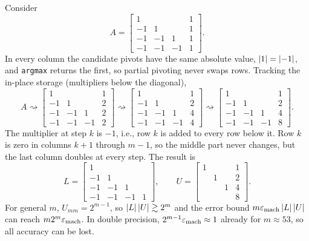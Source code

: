 \begin{example}
  \label{ex:growth}
  Consider
  \begin{equation}
    A = \begin{bmatrix} 1 & & & 1 \\ -1 & 1 & & 1 \\ -1 & -1 & 1 & 1 \\ -1 & -1 & -1 & 1 \end{bmatrix}.
  \end{equation}
  In every column the candidate pivots have the same absolute value, $\left\lvert 1 \right\rvert = \left\lvert -1 \right\rvert$, and \texttt{argmax} returns the first, so partial pivoting never swaps rows. Tracking the in-place storage (multipliers below the diagonal),
  \begin{equation}
    A \rightsquigarrow
    \begin{bmatrix} 1 & & & 1 \\ -1 & 1 & & 2 \\ -1 & -1 & 1 & 2 \\ -1 & -1 & -1 & 2 \end{bmatrix} \rightsquigarrow
    \begin{bmatrix} 1 & & & 1 \\ -1 & 1 & & 2 \\ -1 & -1 & 1 & 4 \\ -1 & -1 & -1 & 4 \end{bmatrix} \rightsquigarrow
    \begin{bmatrix} 1 & & & 1 \\ -1 & 1 & & 2 \\ -1 & -1 & 1 & 4 \\ -1 & -1 & -1 & 8 \end{bmatrix}.
  \end{equation}
  The multiplier at step $k$ is $-1$, i.e., row $k$ is added to every row below it. Row $k$ is zero in columns $k + 1$ through $m - 1$, so the middle part never changes, but the last column doubles at every step. The result is
  \begin{equation}
    L = \begin{bmatrix} 1 & & & \\ -1 & 1 & & \\ -1 & -1 & 1 & \\ -1 & -1 & -1 & 1 \end{bmatrix}, \qquad
    U = \begin{bmatrix} 1 & & & 1 \\ & 1 & & 2 \\ & & 1 & 4 \\ & & & 8 \end{bmatrix}.
  \end{equation}
  For general $m$, $U_{mm} = 2^{m-1}$, so $\left\lvert L \right\rvert\left\lvert U \right\rvert \gtrsim 2^m$ and the error bound $m\varepsilon_{\mathrm{mach}}\left\lvert L \right\rvert\left\lvert U \right\rvert$ can reach $m2^m\varepsilon_{\mathrm{mach}}$. In double precision, $2^{m-1}\varepsilon_{\mathrm{mach}} \approx 1$ already for $m \approx 53$, so all accuracy can be lost.
\end{example}

